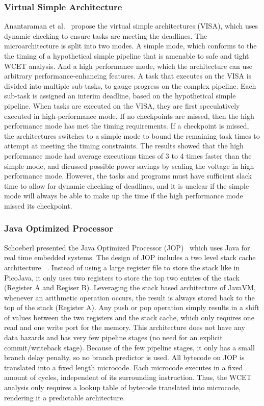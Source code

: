 \subsubsection{Virtual Simple Architecture}
Anantaraman et al.~\cite{Anantaraman2003VISA} propose the virtual simple architectures (VISA), which uses dynamic checking to ensure tasks are meeting the deadlines. 
The microarchitecture is split into two modes. 
A simple mode, which conforms to the the timing of a hypothetical simple pipeline that is amenable to safe and tight WCET analysis. 
And a high performance mode, which the architecture can use arbitrary performance-enhancing features.
A task that executes on the VISA is divided into multiple sub-tasks, to gauge progress on the complex pipeline.
Each sub-task is assigned an interim deadline, based on the hypothetical simple pipeline.  
When tasks are executed on the VISA, they are first speculatively executed in high-performance mode.
If no checkpoints are missed, then the high performance mode has met the timing requirements. 
If a checkpoint is missed, the architectures switches to a simple mode to bound the remaining task times to attempt at meeting the timing constraints.
The results showed that the high performance mode had average executions times of 3 to 4 times faster than the simple mode, and dicussed possible power savings by scaling the voltage in high performance mode.
However, the tasks and programs must have sufficient slack time to allow for dynamic checking of deadlines, and it is unclear if the simple mode will always be able to make up the time if the high performance mode missed its checkpoint. 

\subsubsection{Java Optimized Processor}
\label{sec:RTJava}
Schoeberl presented the Java Optimized Processor (JOP)~\cite{jop:wcet} which uses Java for real time embedded systems. 
The design of JOP includes a two level stack cache architecture ~\cite{jop:stack}. 
Instead of using a large register file to store the stack like in PicoJava\cite{McGhan1998PicoJava}, it only uses two registers to store the top two entries of the stack (Register A and Regiser B). 
Leveraging the stack based architecture of JavaVM, whenever an arithmetic operation occurs, the result is always stored back to the top of the stack (Register A). 
Any push or pop operation simply results in a shift of values between the two registers and the stack cache, which only requires one read and one write port for the memory. 
This architecture does not have any data hazards and has very few pipeline stages (no need for an explicit commit/writeback stage). 
Because of the few pipeline stages, it only has a small branch delay penalty, so no branch predictor is used.
All bytecode on JOP is translated into a fixed length microcode. 
Each microcode executes in a fixed amount of cycles, independent of its surrounding instruction.
Thus, the WCET analysis only requires a lookup table of bytecode translated into microcode, rendering it a predictable architecture. 

